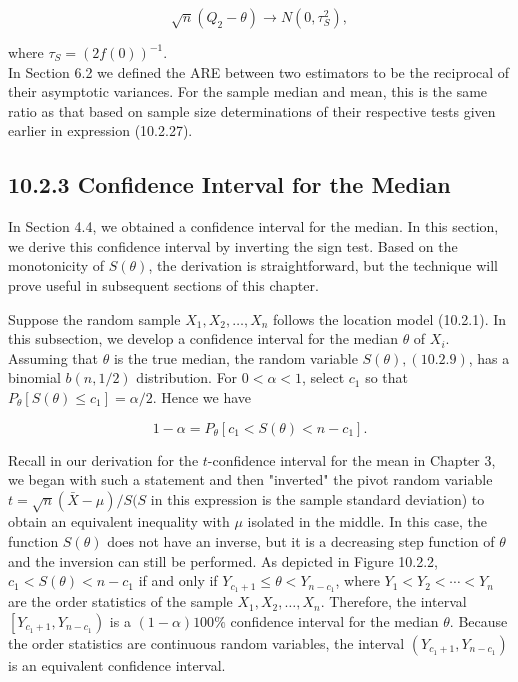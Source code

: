 \begin{equation*}
\sqrt{n}\left(Q_{2}-\theta\right) \rightarrow N\left(0, \tau_{S}^{2}\right), \tag{10.2.35}
\end{equation*}


where $\tau_{S}=(2 f(0))^{-1}$.\\
In Section 6.2 we defined the ARE between two estimators to be the reciprocal of their asymptotic variances. For the sample median and mean, this is the same ratio as that based on sample size determinations of their respective tests given earlier in expression (10.2.27).

\subsection*{10.2.3 Confidence Interval for the Median}
In Section 4.4, we obtained a confidence interval for the median. In this section, we derive this confidence interval by inverting the sign test. Based on the monotonicity of $S(\theta)$, the derivation is straightforward, but the technique will prove useful in subsequent sections of this chapter.

Suppose the random sample $X_{1}, X_{2}, \ldots, X_{n}$ follows the location model (10.2.1). In this subsection, we develop a confidence interval for the median $\theta$ of $X_{i}$. Assuming that $\theta$ is the true median, the random variable $S(\theta),(10.2 .9)$, has a binomial $b(n, 1 / 2)$ distribution. For $0<\alpha<1$, select $c_{1}$ so that $P_{\theta}\left[S(\theta) \leq c_{1}\right]=\alpha / 2$. Hence we have


\begin{equation*}
1-\alpha=P_{\theta}\left[c_{1}<S(\theta)<n-c_{1}\right] . \tag{10.2.36}
\end{equation*}


Recall in our derivation for the $t$-confidence interval for the mean in Chapter 3, we began with such a statement and then "inverted" the pivot random variable $t=\sqrt{n}(\bar{X}-\mu) / S(S$ in this expression is the sample standard deviation) to obtain an equivalent inequality with $\mu$ isolated in the middle. In this case, the function $S(\theta)$ does not have an inverse, but it is a decreasing step function of $\theta$ and the inversion can still be performed. As depicted in Figure 10.2.2, $c_{1}<S(\theta)<n-c_{1}$ if and only if $Y_{c_{1}+1} \leq \theta<Y_{n-c_{1}}$, where $Y_{1}<Y_{2}<\cdots<Y_{n}$ are the order statistics of the sample $X_{1}, X_{2}, \ldots, X_{n}$. Therefore, the interval $\left[Y_{c_{1}+1}, Y_{n-c_{1}}\right)$ is a $(1-\alpha) 100 \%$ confidence interval for the median $\theta$. Because the order statistics are continuous random variables, the interval $\left(Y_{c_{1}+1}, Y_{n-c_{1}}\right)$ is an equivalent confidence interval.

